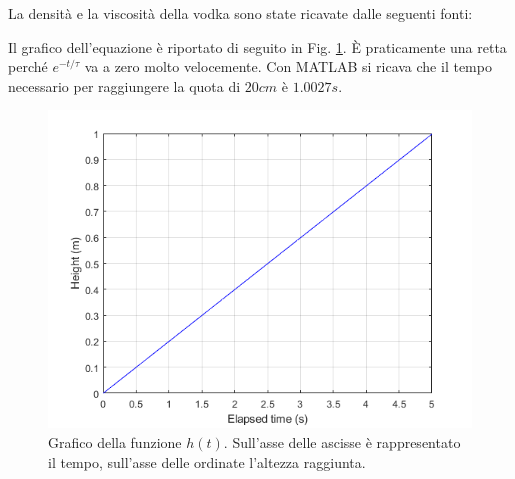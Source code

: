 \documentclass{article}
\begin{document}
\noindent La densità e la viscosità della vodka sono state ricavate dalle seguenti fonti:

Il grafico dell'equazione è riportato di seguito in Fig. \ref{graph}. È praticamente una retta perché $e^{-t/\tau}$ va a zero molto velocemente. Con MATLAB si ricava che il tempo necessario per raggiungere la quota di $20cm$ è $1.0027s$.

\begin{figure}[ht!]
    \centering
    \includegraphics[width=0.8\linewidth]{graph.png}
    \caption{Grafico della funzione $h(t)$. Sull'asse delle ascisse è rappresentato il tempo, sull'asse delle ordinate l'altezza raggiunta.}
    \label{graph}
\end{figure}
\end{document}
